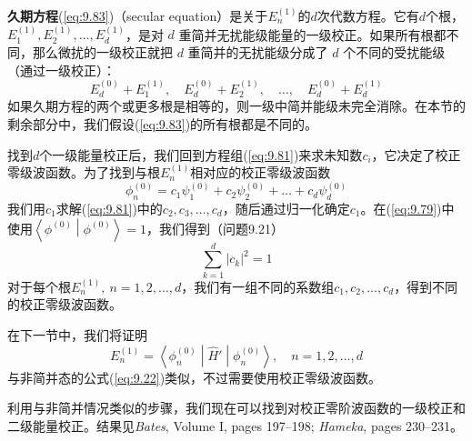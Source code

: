     \textbf{久期方程}(\ref{eq:9.83})（secular equation）是关于$E_n^{\left(1\right)}$的$d$次代数方程。它有$d$个根，$E_1^{\left(1\right)}, E_2^{\left(1\right)}, \ldots, E_d^{\left(1\right)}$，是对 $d$ 重简并无扰能级能量的一级校正。如果所有根都不同，那么微扰的一级校正就把 $d$ 重简并的无扰能级分成了 $d$ 个不同的受扰能级（通过一级校正）：
    \begin{equation*}
        E_d^{\left(0\right)} + E_1^{\left(1\right)}, \quad E_d^{\left(0\right)} + E_2^{\left(1\right)}, \quad \ldots, \quad E_d^{\left(0\right)} + E_d^{\left(1\right)}
    \end{equation*}
    如果久期方程的两个或更多根是相等的，则一级中简并能级未完全消除。在本节的剩余部分中，我们假设(\ref{eq:9.83})的所有根都是不同的。

    找到$d$个一级能量校正后，我们回到方程组(\ref{eq:9.81})来求未知数$c_i$，它决定了校正零级波函数。为了找到与根$E_n^{\left(1\right)}$相对应的校正零级波函数
    \begin{equation}
        \phi_n^{\left(0\right)} = c_1\psi_1^{\left(0\right)} + c_2\psi_2^{\left(0\right)} + \ldots + c_d\psi_d^{\left(0\right)}
        \label{eq:9.84}
    \end{equation}
    我们用$c_1$求解(\ref{eq:9.81})中的$c_2,c_3,\ldots,c_d$，随后通过归一化确定$c_1$。在(\ref{eq:9.79})中使用$\left\langle \phi^{\left(0\right)} \middle| \phi^{\left(0\right)} \right\rangle = 1$，我们得到（问题9.21）
    \begin{equation}
        \sum_{k=1}^{d}\left|c_k\right|^2 = 1
        \label{eq:9.85}
    \end{equation}
    对于每个根$E_n^{\left(1\right)}, \: n = 1,2,\ldots,d$，我们有一组不同的系数组$c_1, c_2, \ldots, c_d$，得到不同的校正零级波函数。

    在下一节中，我们将证明
    \begin{equation}
        E_n^{\left(1\right)} = \left\langle \phi_n^{\left(0\right)} \middle| \hat{H}' \middle| \phi_n^{\left(0\right)} \right\rangle, \quad n = 1,2,\ldots,d
        \label{eq:9.86}
    \end{equation}
    与非简并态的公式(\ref{eq:9.22})类似，不过需要使用校正零级波函数。

    利用与非简并情况类似的步骤，我们现在可以找到对校正零阶波函数的一级校正和二级能量校正。结果见\textit{Bates}, Volume I, pages 197–198; \textit{Hameka}, pages 230–231。

